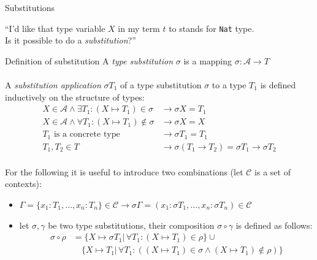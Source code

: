 \documentclass[8pt]{beamer}
\begin{document}
\begin{frame}{Substitutions}
    \begin{center}
        ``I'd like that type variable $X$ in my term $t$ to stands for 
        \texttt{Nat} type. \\Is it possible to do a \emph{substitution}?''
    \end{center}

    \pause
    \begin{block}{Definition of substitution}
        A \emph{type substitution} $\sigma$ is a mapping $\sigma: \mathcal{A}
        \rightarrow T$ \\~\\
        A \emph{substitution application} $\sigma T_{1}$ 
        of a type substitution $\sigma$ to a type $T_{1}$ is defined 
        inductively on the structure of types:
        \begin{displaymath}
            \begin{split}
                X \in \mathcal{A} \wedge \exists T_1: (X \mapsto T_{1}) 
                    \in \sigma & \rightarrow \sigma X = T_{1} \\ 
                X \in \mathcal{A} \wedge \forall T_1: (X \mapsto T_{1}) 
                    \not \in \sigma & \rightarrow \sigma X = X \\ 
                T_{1} \text{ is a concrete type } &\rightarrow  
                    \sigma T_{1} = T_{1}\\
                T_{1}, T_{2} \in T & \rightarrow \sigma(T_{1} \rightarrow 
                    T_{2}) = \sigma T_{1} \rightarrow \sigma T_{2} \\ 
            \end{split}
        \end{displaymath}
    \end{block}
    \pause
    For the following it is useful to introduce two combinations 
    (let $\mathcal{C}$ is a set of contexts):
    \begin{itemize}
        \item $\Gamma = \{ x_1:T_1, \ldots, x_n:T_n\} \in \mathcal{C} 
            \rightarrow \sigma\Gamma = (x_1:\sigma T_1, \ldots,
                x_n:\sigma T_n) \in \mathcal{C}$
        \item let $\sigma, \gamma$ be two type substitutions, their
            composition $\sigma \circ \gamma$ is defined as follows:
            \begin{displaymath}
                \begin{split}
                    \sigma \circ \rho &= \{X \mapsto \sigma T_1 | \,
                        \forall T_1:(X \mapsto T_1) \in \rho \} \cup \\
                    &\quad \{X \mapsto T_1 |\, 
                        \forall T_{1}:\left( (X \mapsto T_1) \in \sigma \wedge
                            (X \mapsto T_1) \not \in \rho\right)\} \\
                \end{split}
            \end{displaymath}
            
    \end{itemize}
\end{frame}
\end{document}
